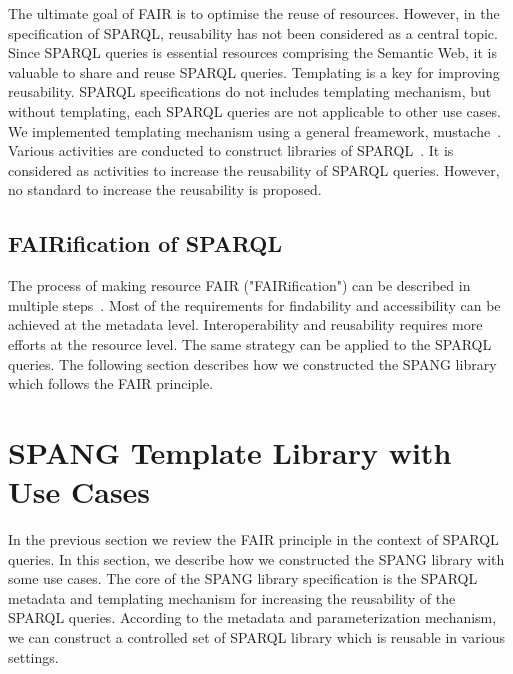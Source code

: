 \documentclass[runningheads]{llncs}
\begin{document}
The ultimate goal of FAIR is to optimise the reuse of resources. 
However, in the specification of SPARQL, reusability has not been considered as a central topic. 
Since SPARQL queries is essential resources comprising the Semantic Web, it is valuable to share and reuse SPARQL queries.
Templating is a key for improving reusability. 
SPARQL specifications do not includes templating mechanism, but without templating, each SPARQL queries are not applicable to other use cases. 
We implemented templating mechanism using a general freamework, mustache~\cite{mustache}.
Various activities are conducted to construct libraries of SPARQL~\cite{bioqueries}. 
It is considered as activities to increase the reusability of SPARQL queries. However, no standard to increase the reusability is proposed. 



\subsection{FAIRification of SPARQL}
The process of making resource FAIR ("FAIRification") can be described in multiple steps~\cite{fairification}.
Most of the requirements for findability and accessibility can be achieved at the metadata level. 
Interoperability and reusability requires more efforts at the resource level.
The same strategy can be applied to the SPARQL queries.
The following section describes how we constructed the SPANG library which follows the FAIR principle.


\section{SPANG Template Library with Use Cases}

In the previous section we review the FAIR principle in the context of SPARQL queries.
In this section, we describe how we constructed the SPANG library with some use cases.
The core of the SPANG library specification is the SPARQL metadata and templating mechanism for increasing the reusability of the SPARQL queries.
According to the metadata and parameterization mechanism, we can construct a controlled set of SPARQL library which is reusable in various settings.
\end{document}

